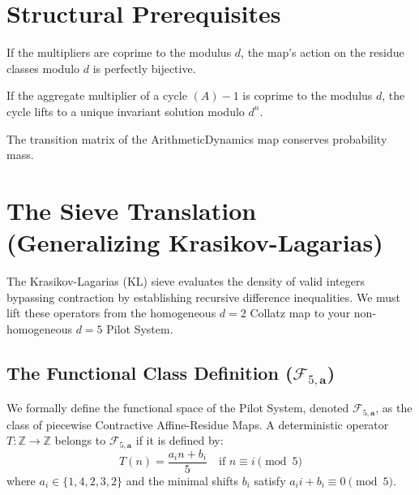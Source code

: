 \chapter{Structural Prerequisites}

\begin{theorem}
\leanok
\label{thm:coprime_invertibility}
If the multipliers are coprime to the modulus $d$, the map's action on the residue classes modulo $d$ is perfectly bijective.
\end{theorem}

\begin{theorem}
\leanok
If the aggregate multiplier of a cycle $(A) - 1$ is coprime to the modulus $d$, the cycle lifts to a unique invariant solution modulo $d^n$.
\end{theorem}

\begin{theorem}
\leanok
The transition matrix of the ArithmeticDynamics map conserves probability mass.
\end{theorem}

\chapter{The Sieve Translation (Generalizing Krasikov-Lagarias)}

The Krasikov-Lagarias (KL) sieve evaluates the density of valid integers bypassing contraction by establishing recursive difference inequalities. We must lift these operators from the homogeneous $d=2$ Collatz map to your non-homogeneous $d=5$ Pilot System.

\section{The Functional Class Definition ($\mathcal{F}_{5, \mathbf{a}}$)}

We formally define the functional space of the Pilot System, denoted $\mathcal{F}_{5, \mathbf{a}}$, as the class of piecewise Contractive Affine-Residue Maps. A deterministic operator $T: \mathbb{Z} \to \mathbb{Z}$ belongs to $\mathcal{F}_{5, \mathbf{a}}$ if it is defined by:
$$ T(n) = \frac{a_i n + b_i}{5} \quad \text{if } n \equiv i \pmod 5 $$
where $a_i \in \{1, 4, 2, 3, 2\}$ and the minimal shifts $b_i$ satisfy $a_i i + b_i \equiv 0 \pmod 5$.

